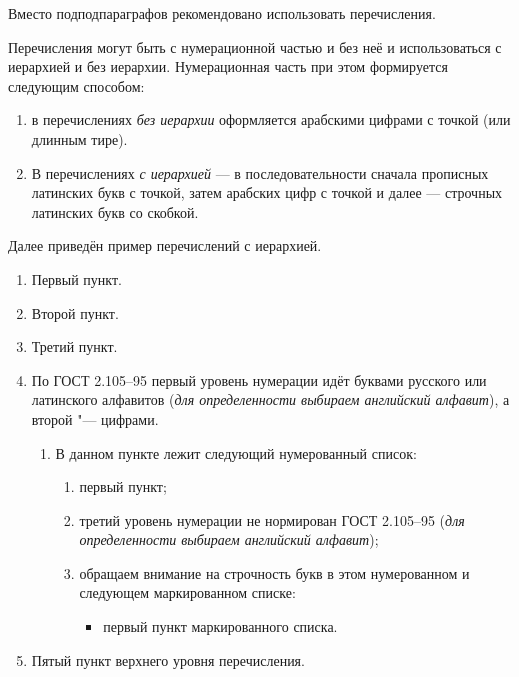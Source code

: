 Вместо подподпараграфов рекомендовано использовать перечисления.

Перечисления могут быть с нумерационной частью и без неё и использоваться с иерархией и без иерархии. Нумерационная часть при этом формируется следующим способом:

\begin{enumerate}[1.]
	\item в перечислениях {\itshape без иерархии} оформляется арабскими цифрами с точкой (или длинным тире).
	\item В перечислениях {\itshape с иерархией} --- в последовательности сначала прописных латинских букв с точкой, затем арабских цифр с точкой и далее --- строчных латинских букв со скобкой. 
\end{enumerate}





Далее приведён пример перечислений с иерархией.


\begin{enumerate}
	\item Первый пункт.
	\item Второй пункт.
	\item Третий пункт.
	\item По ГОСТ 2.105--95 \cite{gost-russian-text-documents} первый уровень нумерации идёт буквами русского или латинского алфавитов ({\itshape для определенности выбираем английский алфавит}),
	а второй "--- цифрами. 
	\begin{enumerate}
		\item В данном пункте лежит следующий нумерованный список: 
		\begin{enumerate}
			\item первый пункт;
			\item третий уровень нумерации не нормирован ГОСТ 2.105--95 ({\itshape для определенности выбираем английский алфавит});
			\item обращаем внимание на строчность букв в этом нумерованном и следующем маркированном списке:
			\begin{itemize}
				\item первый пункт маркированного списка.
			\end{itemize}    
		\end{enumerate}
	\end{enumerate}
	\item Пятый пункт верхнего уровня перечисления.
\end{enumerate}

